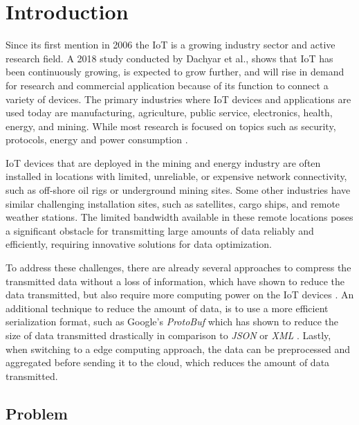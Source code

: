 \chapter{Introduction}
\label{sec:introduction}


Since its first mention in 2006 \cite{Adelmann2006ToolkitFB} the \ac{IoT}
is a growing industry sector and active research field. A 2018 study conducted
by Dachyar et al., shows that \ac{IoT} has been continuously growing, is expected
to grow further, and will rise in demand for research and commercial application
because of its function to connect a variety of devices. The primary industries
where \ac{IoT} devices and applications are used today are manufacturing,
agriculture, public service, electronics, health, energy, and mining.
While most research is focused on topics such as security, protocols, energy and
power consumption \cite{dachyar2019knowledge}.

\ac{IoT} devices that are deployed in the mining and energy industry are often
installed in locations with limited, unreliable, or expensive network
connectivity, such as off-shore oil rigs or underground mining sites.
Some other industries have similar challenging installation sites, such as
satellites, cargo ships, and remote weather stations.
The limited bandwidth available in these remote locations poses a significant
obstacle for transmitting large amounts of data reliably and efficiently,
requiring innovative solutions for data optimization.

To address these challenges, there are already several approaches to compress
the transmitted data without a loss of information, which have shown to reduce
the data transmitted, but also require more computing power on the \ac{IoT}
devices \cite{9243457}. An additional technique to reduce the amount of data,
is to use a more efficient serialization format, such as Google's \textit{ProtoBuf}
which has shown to reduce the size of data transmitted drastically in comparison
to \textit{JSON} or \textit{XML} \cite{7765670}. Lastly, when switching to a
edge computing approach, the data can be preprocessed and aggregated before
sending it to the cloud, which reduces the amount of data transmitted.


\section{Problem}

